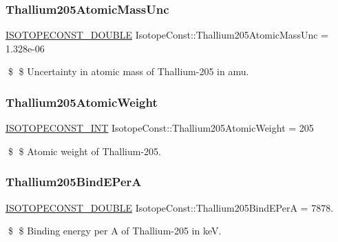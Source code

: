 \subsubsection{\texorpdfstring{Thallium205\+Atomic\+Mass\+Unc}{Thallium205AtomicMassUnc}}
{\footnotesize\ttfamily \mbox{\hyperlink{group___isotope_const-_macros_ga8f45a7272ce02c0b4c65c44636ed719a}{I\+S\+O\+T\+O\+P\+E\+C\+O\+N\+S\+T\+\_\+\+D\+O\+U\+B\+LE}} Isotope\+Const\+::\+Thallium205\+Atomic\+Mass\+Unc = 1.\+328e-\/06}

\$ \$ Uncertainty in atomic mass of Thallium-\/205 in amu. \mbox{\label{group___isotope_const-_thallium-_tl205_gaff4c365318686bdaf785d161beba07cf}} 
\subsubsection{\texorpdfstring{Thallium205\+Atomic\+Weight}{Thallium205AtomicWeight}}
{\footnotesize\ttfamily \mbox{\hyperlink{group___isotope_const-_macros_ga5f18360b3e99483a35c32d789e62621c}{I\+S\+O\+T\+O\+P\+E\+C\+O\+N\+S\+T\+\_\+\+I\+NT}} Isotope\+Const\+::\+Thallium205\+Atomic\+Weight = 205}

\$ \$ Atomic weight of Thallium-\/205. \mbox{\label{group___isotope_const-_thallium-_tl205_gae8a7bc37033ff885630da55c4b495736}} 
\subsubsection{\texorpdfstring{Thallium205\+Bind\+E\+PerA}{Thallium205BindEPerA}}
{\footnotesize\ttfamily \mbox{\hyperlink{group___isotope_const-_macros_ga8f45a7272ce02c0b4c65c44636ed719a}{I\+S\+O\+T\+O\+P\+E\+C\+O\+N\+S\+T\+\_\+\+D\+O\+U\+B\+LE}} Isotope\+Const\+::\+Thallium205\+Bind\+E\+PerA = 7878.}

\$ \$ Binding energy per A of Thallium-\/205 in keV. \mbox{\label{group___isotope_const-_thallium-_tl205_gaa4b04664c5d84b692dda8c0ae2c332a9}} 
